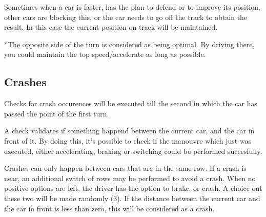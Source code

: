 Sometimes when a car is faster, has the plan to defend or to improve its position, other cars are blocking this, or the car needs to go off the track to obtain the result. In this case the current position on track will be maintained.

*The opposite side of the turn is considered as being optimal. By driving there, you could maintain the top speed/accelerate as long as possible.

\subsection{Crashes}
Checks for crash occurences will be executed till the second in which the car has passed the point of the first turn.

A check validates if something happend between the current car, and the car in front of it. By doing this, it's possible to check if the manouvre which just was executed, either accelerating, braking or switching could be performed succesfully.

Crashes can only happen between cars that are in the same row. If a crash is near, an additional switch of rows may be performed to avoid a crash. When no positive options are left, the driver has the option to brake, or crash. A choice out these two will be made randomly (3). If the distance between the current car and the car in front is less than zero, this will be considered as a crash.
